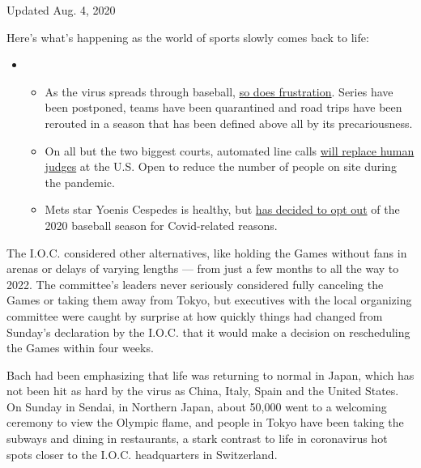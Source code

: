Updated Aug. 4, 2020

Here's what's happening as the world of sports slowly comes back to
life:

\begin{itemize}
\item
  \begin{itemize}
  \tightlist
  \item
    As the virus spreads through baseball,
    \href{https://www.nytimes.com/2020/08/03/sports/baseball/mlb-coronavirus-outbreak.html?action=click\&pgtype=Article\&state=default\&region=MAIN_CONTENT_2\&context=storylines_keepup}{so
    does frustration}. Series have been postponed, teams have been
    quarantined and road trips have been rerouted in a season that has
    been defined above all by its precariousness.
  \item
    On all but the two biggest courts, automated line calls
    \href{https://www.nytimes.com/2020/08/03/sports/tennis/us-open-hawkeye-line-judges.html?action=click\&pgtype=Article\&state=default\&region=MAIN_CONTENT_2\&context=storylines_keepup}{will
    replace human judges} at the U.S. Open to reduce the number of
    people on site during the pandemic.
  \item
    Mets star Yoenis Cespedes is healthy, but
    \href{https://www.nytimes.com/2020/08/02/sports/baseball/Yoenis-cespedes-opt-out-rule.html?action=click\&pgtype=Article\&state=default\&region=MAIN_CONTENT_2\&context=storylines_keepup}{has
    decided to opt out} of the 2020 baseball season for Covid-related
    reasons.
  \end{itemize}
\end{itemize}

The I.O.C. considered other alternatives, like holding the Games without
fans in arenas or delays of varying lengths --- from just a few months
to all the way to 2022. The committee's leaders never seriously
considered fully canceling the Games or taking them away from Tokyo, but
executives with the local organizing committee were caught by surprise
at how quickly things had changed from Sunday's declaration by the
I.O.C. that it would make a decision on rescheduling the Games within
four weeks.

Bach had been emphasizing that life was returning to normal in Japan,
which has not been hit as hard by the virus as China, Italy, Spain and
the United States. On Sunday in Sendai, in Northern Japan, about 50,000
went to a welcoming ceremony to view the Olympic flame, and people in
Tokyo have been taking the subways and dining in restaurants, a stark
contrast to life in coronavirus hot spots closer to the I.O.C.
headquarters in Switzerland.

